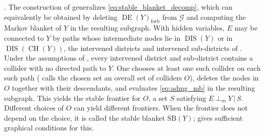 \documentclass{article}
\newcommand{\G}{\mathcal{G}}
\newcommand{\DEYforb}{\DE(Y)_\mathrm{forb}}
\newcommand{\SB}{\mathrm{SB}}
\DeclareMathOperator{\CH}{CH}
\DeclareMathOperator{\DE}{DE}
\DeclareMathOperator{\DIS}{DIS}
\newcommand{\given}{\,|\,}
\newcommand{\msep}{\mathrel{\perp_{m}}}
\begin{document}
\citep{richardsonMarkovPropertiesAcyclic2003}. The construction of \citet{xiangStableBlanketHidden2026} generalizes \eqref{eq:stable_blanket_decomp}, which can equivalently be obtained by deleting $\DEYforb$ from $\G$ and computing the Markov blanket of $Y$ in the resulting subgraph. 
With hidden variables, $E$ may be connected to $Y$ by paths whose intermediate nodes lie in $\DIS(Y)$ or in $\DIS(\CH(Y))$, the intervened districts and intervened sub-districts of \citet{xiangStableBlanketHidden2026}. Under the assumptions of \citet[Setting~6.1]{xiangStableBlanketHidden2026}, every intervened district and sub-district contains a collider with no directed path to $Y$. One chooses at least one such collider on each such path (\citet{xiangStableBlanketHidden2026} calls the chosen set an overall set of colliders $O$), deletes the nodes in $O$ together with their descendants, and evaluates \eqref{eq:admg_mb} in the resulting subgraph. This yields the stable frontier for $O$, a set $S$ satisfying $E \msep Y \given S$. Different choices of $O$ can yield different frontiers. When the frontier does not depend on the choice, it is called the stable blanket $\SB(Y)$; \citet{xiangStableBlanketHidden2026} gives sufficient graphical conditions for this.
 
\end{document}
